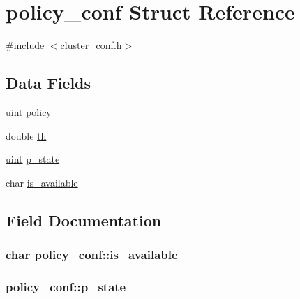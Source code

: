 \hypertarget{structpolicy__conf}{}\section{policy\+\_\+conf Struct Reference}
\label{structpolicy__conf}


{\ttfamily \#include $<$cluster\+\_\+conf.\+h$>$}

\subsection*{Data Fields}
\begin{DoxyCompactItemize}
\item 
\hyperlink{generic_8h_a91ad9478d81a7aaf2593e8d9c3d06a14}{uint} \hyperlink{structpolicy__conf_a13b8139b6bbca7153bc2890f8941c3d4}{policy}
\item 
double \hyperlink{structpolicy__conf_ad9e739dbfec746ae19a5e688062076d5}{th}
\item 
\hyperlink{generic_8h_a91ad9478d81a7aaf2593e8d9c3d06a14}{uint} \hyperlink{structpolicy__conf_ae688188c0b05d9616de5186ecb66d8e1}{p\+\_\+state}
\item 
char \hyperlink{structpolicy__conf_a1735820221b6e1c5cd9ff3f86b5b49e7}{is\+\_\+available}
\end{DoxyCompactItemize}


\subsection{Field Documentation}
\subsubsection[{\texorpdfstring{is\+\_\+available}{is_available}}]{\setlength{\rightskip}{0pt plus 5cm}char policy\+\_\+conf\+::is\+\_\+available}\hypertarget{structpolicy__conf_a1735820221b6e1c5cd9ff3f86b5b49e7}{}\label{structpolicy__conf_a1735820221b6e1c5cd9ff3f86b5b49e7}
\subsubsection[{\texorpdfstring{p\+\_\+state}{p_state}}]{ policy\+\_\+conf\+::p\+\_\+state}\hypertarget{structpolicy__conf_ae688188c0b05d9616de5186ecb66d8e1}{}\label{structpolicy__conf_ae688188c0b05d9616de5186ecb66d8e1}
